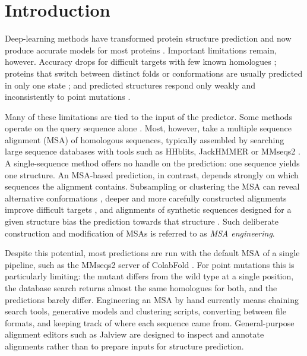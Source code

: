 \documentclass[webpdf,contemporary,large]{oup-authoring-template}%
\begin{document}

\maketitle

\section{Introduction}
Deep-learning methods have transformed protein structure prediction and now produce accurate models for most proteins \cite{alphafold2,alphafold3,rosettafold}. Important limitations remain, however. Accuracy drops for difficult targets with few known homologues \cite{casp,plmsearch_application}; proteins that switch between distinct folds or conformations are usually predicted in only one state \cite{fold-switching_protein,chakravarty_fold_switching}; and predicted structures respond only weakly and inconsistently to point mutations \cite{proteingym,alphafold_does_not_work_for_stability,alphafold_works_for_stability,big_af2_study}.

Many of these limitations are tied to the input of the predictor. Some methods operate on the query sequence alone \cite{esm3,omegafold,chai}. Most, however, take a multiple sequence alignment (MSA) of homologous sequences, typically assembled by searching large sequence databases \cite{uniref,uniclust,mgnify} with tools such as HHblits, JackHMMER or MMseqs2 \cite{hhblits,jackhmmer,mmseqs2}. A single-sequence method offers no handle on the prediction: one sequence yields one structure. An MSA-based prediction, in contrast, depends strongly on which sequences the alignment contains. Subsampling or clustering the MSA can reveal alternative conformations \cite{random_cluster,af2_cluster,italian_clustering}, deeper and more carefully constructed alignments improve difficult targets \cite{deepmsa,casp_msa_engineering}, and alignments of synthetic sequences designed for a given structure bias the prediction towards that structure \cite{inverse_folding}. Such deliberate construction and modification of MSAs is referred to as \emph{MSA engineering}.

Despite this potential, most predictions are run with the default MSA of a single pipeline, such as the MMseqs2 server of ColabFold \cite{colabfold}. For point mutations this is particularly limiting: the mutant differs from the wild type at a single position, the database search returns almost the same homologues for both, and the predictions barely differ. Engineering an MSA by hand currently means chaining search tools, generative models and clustering scripts, converting between file formats, and keeping track of where each sequence came from. General-purpose alignment editors such as Jalview \cite{jalview} are designed to inspect and annotate alignments rather than to prepare inputs for structure prediction.
\end{document}
